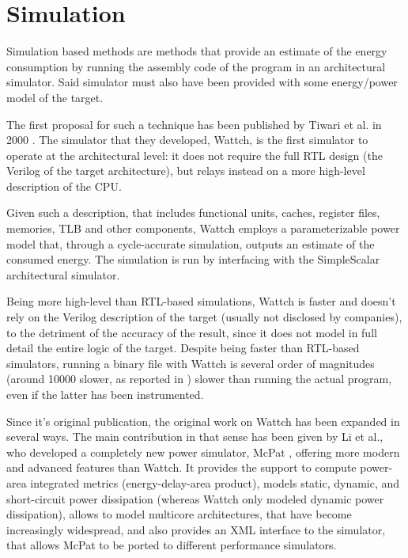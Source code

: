 \section{Simulation}
Simulation based methods are methods that provide an estimate of the energy consumption by running the assembly code of the program in an architectural simulator. Said simulator must also have been provided with some energy/power model of the target.
\par The first proposal for such a technique has been published by Tiwari et al. in 2000 \cite{wattch}. The simulator that they developed, Wattch, is the first simulator to operate at the architectural level: it does not require the full RTL design (the Verilog of the target architecture), but relays instead on a more high-level description of the CPU. 
\par Given such a description, that includes functional units, caches, register files, memories, TLB and other components, Wattch employs a parameterizable power model that, through a cycle-accurate simulation, outputs an estimate of the consumed energy. 
The simulation is run by interfacing with the SimpleScalar \cite{simplescalar} architectural simulator. 
\par Being more high-level than RTL-based simulations, Wattch is faster and doesn't rely on the Verilog description of the target (usually not disclosed by companies), to the detriment of the accuracy of the result, since it does not model in full detail the entire logic of the target.
\newline Despite being faster than RTL-based simulators, running a binary file with Wattch is several order of magnitudes (around 10000 slower, as reported in \cite{brando2008}) slower than running the actual program, even if the latter has been instrumented. 
\par Since it's original publication, the original work on Wattch has been expanded in several ways. The main contribution in that sense has been given by Li et al., who developed a completely new power simulator, McPat \cite{mcpat}, offering more modern and advanced features than Wattch. \newline It provides the support to compute power-area integrated metrics (energy-delay-area product), models static, dynamic, and short-circuit power dissipation (whereas Wattch only modeled dynamic power dissipation), allows to model multicore architectures, that have become increasingly widespread, and also provides an XML interface to the simulator, that allows McPat to be ported to different performance simulators. 
